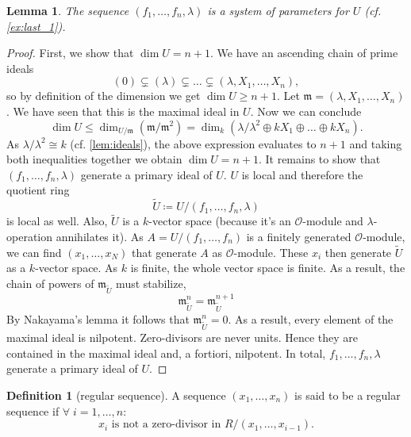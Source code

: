 \documentclass{article}
\theoremstyle{plain}%
\newtheorem{lemma}{Lemma}[section]
\theoremstyle{definition}
\newtheorem{definition}{Definition}[section]
\theoremstyle{remark}
\begin{document}
\begin{lemma}\label{lem:sys_params}
    The sequence \((f_1, \dots, f_n, \lambda)\) is a system of parameters for \(U\) (cf. \cref{ex:last_1}).
\end{lemma}
\begin{proof}
    First, we show that \(\dim U = n + 1\).
    We have an ascending chain of prime ideals
    \[
        (0) \subsetneq (\lambda) \subsetneq \dots \subsetneq (\lambda, X_1, \dots, X_n),  
    \]
    so by definition of the dimension we get \(\dim U \geq n + 1\).
    Let \(\mathfrak{m} = (\lambda, X_1, \dots, X_n)\). We have seen that this is the maximal ideal in \(U\).
    Now we can conclude
    \[
        \dim U \leq \dim_{U/\mathfrak{m}}(\mathfrak{m}/\mathfrak{m}^2) 
        = \dim_k(\lambda/\lambda^2 \oplus k X_1 \oplus \dots \oplus k X_n).
    \]
    As \(\lambda/\lambda^2 \cong k\) (cf. \cref{lem:ideals}), the above expression evaluates to \(n+1\) and
    taking both inequalities together we obtain \(\dim U = n + 1\).
    It remains to show that \((f_1, \dots, f_n, \lambda)\) generate a primary ideal of \(U\).
    \(U\) is local and therefore the quotient ring 
    \[\tilde{U} \coloneqq U/(f_1, \dots, f_n, \lambda)\] 
    is local as well.
    Also, \(\tilde U\) is a \(k\)-vector space (because it's an \(\mathcal{O}\)-module and \(\lambda\)-operation
    annihilates it). As \(A = U/(f_1, \dots, f_n)\) is a finitely generated \(\mathcal{O}\)-module, we can find
    \((x_1, \dots, x_N)\) that generate \(A\) as \(\mathcal{O}\)-module.
    These \(x_i\) then generate \(\tilde U\) as a \(k\)-vector space.
    As \(k\) is finite, the whole vector space is finite.
    As a result, the chain of powers of \(\mathfrak{m}_{\tilde U}\) must stabilize,
    \[
        \mathfrak{m}_{\tilde U}^n = \mathfrak{m}_{\tilde U}^{n+1}
    \]
    By Nakayama's lemma it follows that \(\mathfrak{m}_{\tilde U}^n = 0\).
    As a result, every element of the maximal ideal is nilpotent.
    Zero-divisors are never units. Hence they are contained in the maximal ideal and, a fortiori, nilpotent.
    In total, \(f_1, \dots, f_n, \lambda\) generate a primary ideal of \(U\).
\end{proof}

\begin{definition}[regular sequence]
    A sequence \((x_1, \dots, x_n)\) is said to be a regular sequence 
    if \(\forall\; i = 1, \dots, n\colon\)
    \[x_i \text{ is not a zero-divisor in } R/(x_1, \dots, x_{i-1}).\]
\end{definition}
\end{document}
